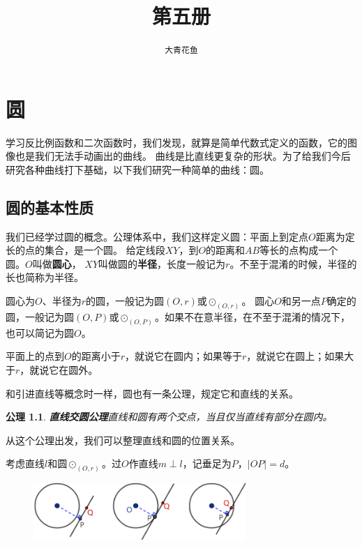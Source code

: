\documentclass[12pt,UTF8]{ctexbook}
\title{\zihao{0} \bfseries 第五册}
\author{\zihao{2} \texttt{大青花鱼}}
\date{}
\newtheorem{po}{公理}
\begin{document}
\maketitle
\tableofcontents
\newpage

\chapter{圆}

学习反比例函数和二次函数时，我们发现，就算是简单代数式定义的函数，它的图像也是我们无法手动画出的曲线。
曲线是比直线更复杂的形状。为了给我们今后研究各种曲线打下基础，以下我们研究一种简单的曲线：圆。

\section{圆的基本性质}
我们已经学过圆的概念。公理体系中，我们这样定义圆：平面上到定点$O$距离为定长的点的集合，是一个圆。
给定线段$XY$，到$O$的距离和$AB$等长的点构成一个圆。$O$叫做\textbf{圆心}，
$XY$叫做圆的\textbf{半径}，长度一般记为$r$。不至于混淆的时候，半径的长也简称为半径。

圆心为$O$、半径为$r$的圆，一般记为圆$(O, r)$或$\odot_{(O, r)}$。
圆心$O$和另一点$P$确定的圆，一般记为圆$(O, P)$或$\odot_{(O, P)}$。如果不在意半径，在不至于混淆的情况下，
也可以简记为圆$O$。

平面上的点到$O$的距离小于$r$，就说它在圆内；如果等于$r$，就说它在圆上；如果大于$r$，就说它在圆外。

和引进直线等概念时一样，圆也有一条公理，规定它和直线的关系。
\begin{po}\textbf{直线交圆公理}\label{po:0}
    直线和圆有两个交点，当且仅当直线有部分在圆内。
\end{po}

从这个公理出发，我们可以整理直线和圆的位置关系。

考虑直线$l$和圆$\odot_{(O, r)}$。过$O$作直线$m\perp l$，记垂足为$P$，$|OP| = d$。

\begin{figure}[h] %
    \vspace{8pt}
    \centering
    \includegraphics[width=0.72\textwidth]{圆与直线1.png}
\end{figure}
\end{document}
